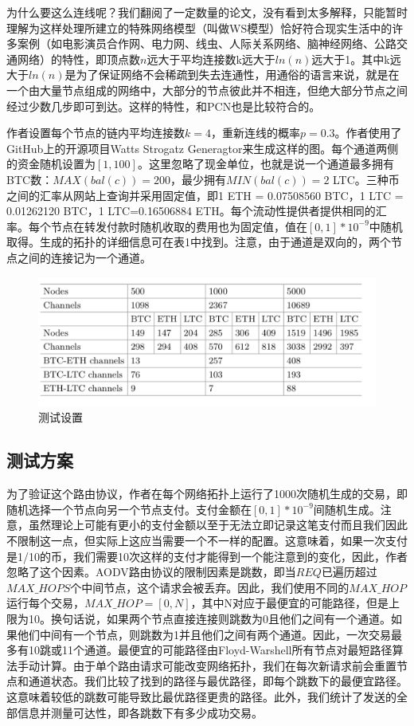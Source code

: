 \documentclass[12pt,a4paper]{article}
\begin{document}
为什么要这么连线呢？我们翻阅了一定数量的论文，没有看到太多解释，只能暂时理解为这样处理所建立的特殊网络模型（叫做WS模型）恰好符合现实生活中的许多案例（如电影演员合作网、电力网、线虫、人际关系网络、脑神经网络、公路交通网络）的特性，即顶点数$n$远大于平均连接数k远大于$ln(n)$远大于1。其中k远大于$ln(n)$是为了保证网络不会稀疏到失去连通性\cite{bollaba1985random}，用通俗的语言来说，就是在一个由大量节点组成的网络中，大部分的节点彼此并不相连，但绝大部分节点之间经过少数几步即可到达。这样的特性，和PCN也是比较符合的。

作者设置每个节点的链内平均连接数$k=4$，重新连线的概率$p=0.3$。作者使用了GitHub上的开源项目Watts Strogatz Generagtor\cite{gs-ui-swing}来生成这样的图。每个通道两侧的资金随机设置为$[1,100]$。这里忽略了现金单位，也就是说一个通道最多拥有BTC数：$MAX(bal(c))=200$，最少拥有$MIN(bal(c))=2$ LTC。三种币之间的汇率从网站\cite{coin_market_cap}上查询并采用固定值，即1 ETH = 0.07508560 BTC，1 LTC = 0.01262120 BTC，1 LTC=0.16506884 ETH。每个流动性提供者提供相同的汇率。每个节点在转发付款时随机收取的费用也为固定值，值在$[0,1]*10^{-9}​$中随机取得。生成的拓扑的详细信息可在表1中找到。注意，由于通道是双向的，两个节点之间的连接记为一个通道。

\begin{figure}[htb]
\centering
\includegraphics[width=14cm]{image-20181127153012674}
\caption{测试设置}
\end{figure}

\subsection{测试方案}
为了验证这个路由协议，作者在每个网络拓扑上运行了1000次随机生成的交易，即随机选择一个节点向另一个节点支付。支付金额在$[0,1]*10^{-9}$间随机生成。注意，虽然理论上可能有更小的支付金额以至于无法立即记录这笔支付而且我们因此不限制这一点，但实际上这应当需要一个不一样的配置。这意味着，如果一次支付是1/10的币，我们需要10次这样的支付才能得到一个能注意到的变化，因此，作者忽略了这个因素。AODV路由协议的限制因素是跳数，即当$REQ$已遍历超过$MAX\_HOPS$个中间节点，这个请求会被丢弃。因此，我们使用不同的$MAX\_HOP$运行每个交易，$MAX\_HOP=[0,N]$，其中N对应于最便宜的可能路径，但是上限为10。换句话说，如果两个节点直接连接则跳数为0且他们之间有一个通道。如果他们中间有一个节点，则跳数为1并且他们之间有两个通道。因此，一次交易最多有10跳或11个通道。最便宜的可能路径由Floyd-Warshell所有节点对最短路径算法手动计算。由于单个路由请求可能改变网络拓扑，我们在每次新请求前会重置节点和通道状态。我们比较了找到的路径与最优路径，即每个跳数下的最便宜路径。这意味着较低的跳数可能导致比最优路径更贵的路径。此外，我们统计了发送的全部信息并测量可达性，即各跳数下有多少成功交易。
\end{document}
